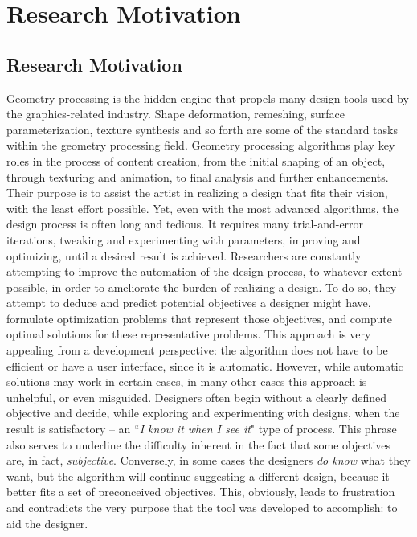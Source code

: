 \chapter{Research Motivation}

\section{Research Motivation}
Geometry processing is the hidden engine that propels many design tools used by the graphics-related industry. Shape deformation, remeshing, surface parameterization, texture synthesis and so forth \cite{PMP:2010} are some of the standard tasks within the geometry processing field. Geometry processing algorithms play key roles in the process of content creation, from the initial shaping of an object, through texturing and animation, to final analysis and further enhancements. Their purpose is to assist the artist in realizing a design that fits their vision, with the least effort possible. Yet, even with the most advanced algorithms, the design process is often long and tedious. It requires many trial-and-error iterations, tweaking and experimenting with parameters, improving and optimizing, until a desired result is achieved. Researchers are constantly attempting to improve the automation of the design process, to whatever extent possible, in order to ameliorate the burden of realizing a design. To do so, they attempt to deduce and predict potential objectives a designer might have, formulate optimization problems that represent those objectives, and compute optimal solutions for these representative problems. This approach is very appealing from a development perspective: the algorithm does not have to be efficient or have a user interface, since it is automatic. However, while automatic solutions may work in certain cases, in many other cases this approach is unhelpful, or even misguided. Designers often begin without a clearly defined objective and  decide, while exploring and experimenting with designs, when the result is satisfactory -- an ``\emph{I know it when I see it}" type of process. This phrase also serves to underline the difficulty inherent in the fact that some objectives are, in fact, \emph{subjective}.  Conversely, in some cases the designers \emph{do know} what they want, but the algorithm will continue suggesting a different design, because it better fits a set of preconceived objectives. This, obviously, leads to frustration and contradicts the very purpose that the tool was developed to accomplish: to aid the designer.

